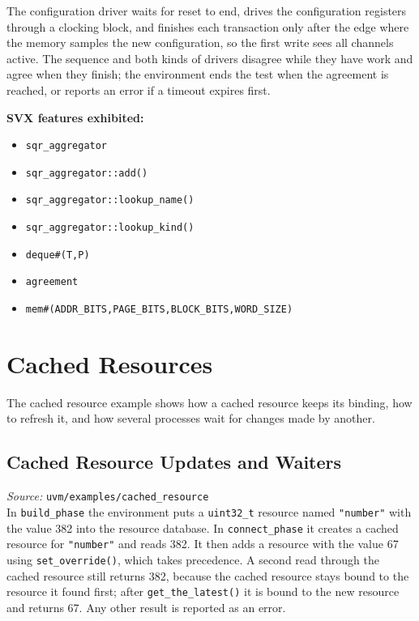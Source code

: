\documentclass[11pt,letterpaper]{report}
\begin{document}
The configuration driver waits for reset to end, drives the configuration registers through a clocking block, and finishes each transaction only after the edge where the memory samples the new configuration, so the first write sees all channels active. The sequence and both kinds of drivers disagree while they have work and agree when they finish; the environment ends the test when the agreement is reached, or reports an error if a timeout expires first.

\textbf{SVX features exhibited:}

\begin{itemize}
  \item \texttt{sqr\_aggregator}
  \item \texttt{sqr\_aggregator::add()}
  \item \texttt{sqr\_aggregator::lookup\_name()}
  \item \texttt{sqr\_aggregator::lookup\_kind()}
  \item \texttt{deque\#(T,P)}
  \item \texttt{agreement}
  \item \texttt{mem\#(ADDR\_BITS,PAGE\_BITS,BLOCK\_BITS,WORD\_SIZE)}
\end{itemize}
\chapter{Cached Resources}

The cached resource example shows how a cached resource keeps its binding, how to refresh it, and how several processes wait for changes made by another.

\section{Cached Resource Updates and Waiters}

\textit{Source:} \texttt{uvm/examples/cached\_resource}\\

In \texttt{build\_phase} the environment puts a \texttt{uint32\_t} resource named \texttt{"number"} with the value 382 into the resource database. In \texttt{connect\_phase} it creates a cached resource for \texttt{"number"} and reads 382. It then adds a resource with the value 67 using \texttt{set\_override()}, which takes precedence. A second read through the cached resource still returns 382, because the cached resource stays bound to the resource it found first; after \texttt{get\_the\_latest()} it is bound to the new resource and returns 67. Any other result is reported as an error.
\end{document}

